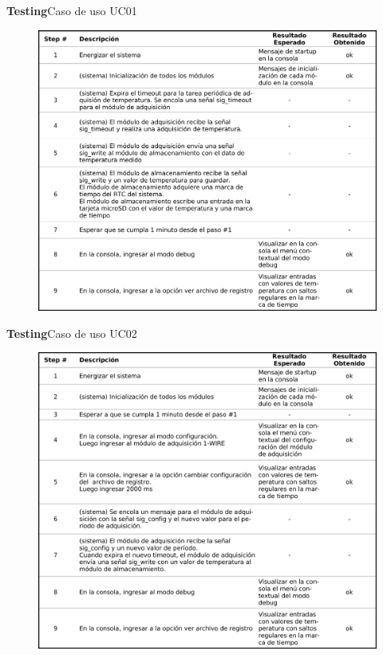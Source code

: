 \documentclass[11pt, xcolor={table,xcdraw}]{beamer}
\begin{document}
\begin{frame}[t]{\textbf{\LARGE{Testing}}}{Caso de uso UC01}
	\vspace{-.7cm}
	\begin{figure}[H]
	  \includegraphics[width=.77\textwidth]{./imagenes/UseCase_detalle1.png}
	\end{figure}	
\end{frame}

\begin{frame}[t]{\textbf{\LARGE{Testing}}}{Caso de uso UC02}
	\vspace{-.7cm}
	\begin{figure}[H]
	  \includegraphics[width=.77\textwidth]{./imagenes/UseCase_detalle2.png}
	\end{figure}	
\end{frame}
\end{document}

